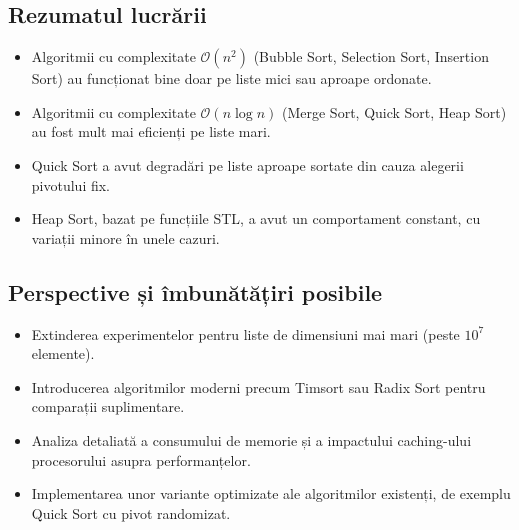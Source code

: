 \documentclass{article}
\begin{document}
\subsection{Rezumatul lucrării}
\begin{itemize}
    \item Algoritmii cu complexitate $\mathcal{O}(n^2)$ (Bubble Sort, Selection Sort, Insertion Sort) au funcționat bine doar pe liste mici sau aproape ordonate.
    \item Algoritmii cu complexitate $\mathcal{O}(n\log n)$ (Merge Sort, Quick Sort, Heap Sort) au fost mult mai eficienți pe liste mari.
    \item Quick Sort a avut degradări pe liste aproape sortate din cauza alegerii pivotului fix.
    \item Heap Sort, bazat pe funcțiile STL, a avut un comportament constant, cu variații minore în unele cazuri.
\end{itemize}

\subsection{Perspective și îmbunătățiri posibile}
\begin{itemize}
    \item Extinderea experimentelor pentru liste de dimensiuni mai mari (peste $10^7$ elemente).
    \item Introducerea algoritmilor moderni precum Timsort sau Radix Sort pentru comparații suplimentare.
    \item Analiza detaliată a consumului de memorie și a impactului caching-ului procesorului asupra performanțelor.
    \item Implementarea unor variante optimizate ale algoritmilor existenți, de exemplu Quick Sort cu pivot randomizat.
\end{itemize}


\end{document}

